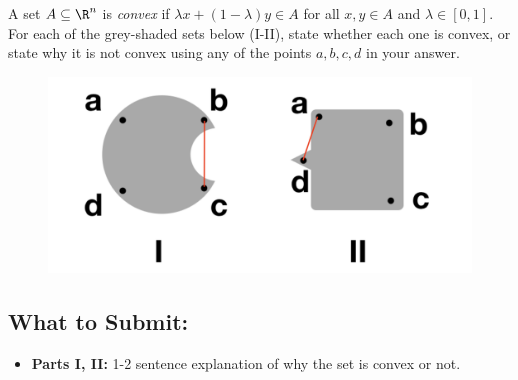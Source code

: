 \documentclass{article}
\begin{document}
\begin{aprob}
     A set $A \subseteq \R^n$ is \emph{convex} if $\lambda x + (1-\lambda) y \in A$ for all $x,y\in A$ and $\lambda \in [0,1]$.
    For each of the grey-shaded sets below (I-II), state whether each one is convex, or state why it is not convex using any of the points $a,b,c,d$ in your answer. 
    
    \begin{figure}[!h]
        \centering
        \includegraphics[width=.6\textwidth]{../img/convex_shapes2.png}
    \end{figure}

    \subsection*{What to Submit:}
    \begin{itemize}
        \item \textbf{Parts I, II:} 1-2 sentence explanation of why the set is convex or not.
    \end{itemize}
\end{aprob}
\end{document}
